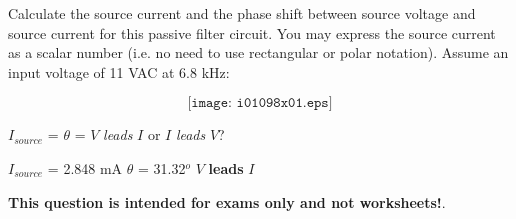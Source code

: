

Calculate the source current and the phase shift between source voltage and source current for this passive filter circuit.  You may express the source current as a scalar number (i.e. no need to use rectangular or polar notation).  Assume an input voltage of 11 VAC at 6.8 kHz:

$$\texttt{[image: i01098x01.eps]}$$

$I_{source}$ = \hskip 100pt $\theta$ = \hskip 100pt $V$ {\it leads} $I$ or $I$ {\it leads} $V$?  

\vskip 10pt







$I_{source}$ = 2.848 mA \hskip 100pt $\theta$ = 31.32$^{o}$ \hskip 100pt $V$ {\bf leads} $I$ 







{\bf This question is intended for exams only and not worksheets!}.



